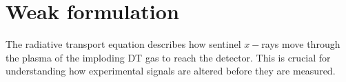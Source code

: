 \section{\label{sec:weak}Weak formulation}

The radiative transport equation describes how sentinel $x-$rays move through the plasma of the imploding DT gas to reach the detector. This is crucial for understanding how experimental signals are altered before they are measured.

%

\endinput %